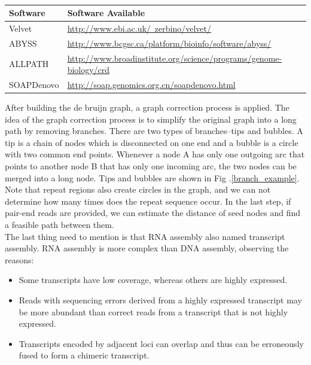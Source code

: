 \documentclass{article}
\begin{document}
\begin{table}[ht]
\begin{center}
\caption{}\label{links_of_assemblers}
\begin{tabular}{l|l}
\hline
Software &Software Available\\
\hline
Velvet &\href{http://www.ebi.ac.uk/~zerbino/velvet/}{http://www.ebi.ac.uk/~zerbino/velvet/}\\
\hline
ABYSS &\href{http://www.bcgsc.ca/platform/bioinfo/software/abyss/}{http://www.bcgsc.ca/platform/bioinfo/software/abyss/}\\
\hline
ALLPATH &\href{http://www.broadinstitute.org/science/programs/genome-biology/crd}{http://www.broadinstitute.org/science/programs/genome-biology/crd}\\
\hline
SOAPDenovo &\href{http://soap.genomics.org.cn/soapdenovo.html}{http://soap.genomics.org.cn/soapdenovo.html}\\
\hline
\end{tabular}
\end{center}
\end{table}
\noindent After building the de bruijn graph, a graph correction process is applied. The idea of the graph correction process is to simplify the original graph into a long path by removing branches. There are two types of branches--tips and bubbles. A tip is a chain of nodes which is disconnected on one end and a bubble is a circle with two common end points. Whenever a node A has only one outgoing arc that points to another node B that has only one incoming arc, the two nodes can be merged into a long node. Tips and bubbles are shown in Fig .\ref{branch_example}. Note that repeat regions also create circles in the graph, and we can not determine how many times does the repeat sequence occur. In the last step, if pair-end reads are provided, we can estimate the distance of seed nodes and find a feasible path between them.\\
The last thing need to mention is that RNA assembly also named transcript assembly. RNA assembly is more complex than DNA assembly, observing the reasons:
\begin{itemize}
 \item Some transcripts have low coverage, whereas others are highly expressed.
 \item Reads with sequencing errors derived from a highly expressed transcript may be more abundant than correct reads from a transcript that is not highly expressed.
 \item Transcripts encoded by adjacent loci can overlap and thus can be erroneously fused to form a chimeric transcript.
\end{itemize}
\end{document}

